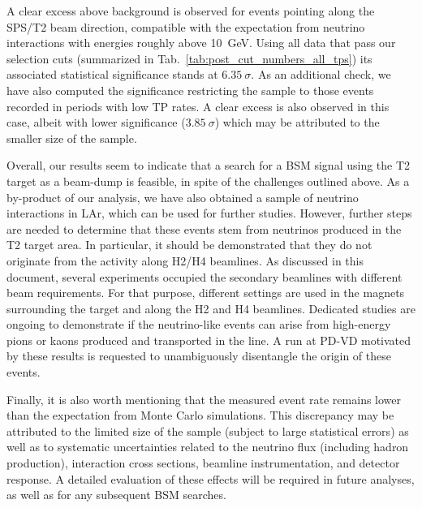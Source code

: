 A clear excess above background is observed for events pointing along the SPS/T2 beam direction, compatible with the expectation from neutrino interactions with energies roughly above 10~GeV. Using all data that pass our selection cuts (summarized in Tab.~\ref{tab:post_cut_numbers_all_tps}) its associated statistical significance stands at $6.35~\sigma$. As an additional check, we have also computed the significance  restricting the sample to those events recorded in periods with low TP rates. A clear excess is also observed in this case, albeit with lower significance ($3.85~\sigma$) which may be attributed to the smaller size of the sample. 

Overall, our results seem to indicate that a search for a BSM signal using the T2 target as a beam-dump is feasible, in spite of the challenges outlined above. As a by-product of our analysis, we have also obtained a sample of neutrino interactions in LAr, which can be used for further studies. However, further steps are needed to determine that these events stem from neutrinos produced in the T2 target area. In particular, it should be demonstrated that they do not originate from the activity along H2/H4 beamlines. As discussed in this document, several experiments occupied the secondary beamlines with different beam requirements. For that purpose, different settings are used in the magnets surrounding the target and along the H2 and H4 beamlines. Dedicated studies are ongoing to demonstrate if the neutrino-like events can arise from high-energy pions or kaons produced and transported in the line. A run at PD-VD motivated by these results is requested to unambiguously disentangle the origin of these events. 

Finally, it is also worth mentioning that the measured event rate remains lower than the expectation from Monte Carlo simulations. This discrepancy may be attributed to the limited size of the sample (subject to large statistical errors) as well as to systematic uncertainties related to the neutrino flux (including hadron production), interaction cross sections, beamline instrumentation, and detector response. A detailed evaluation of these effects will be required in future analyses, as well as for any subsequent BSM searches.
